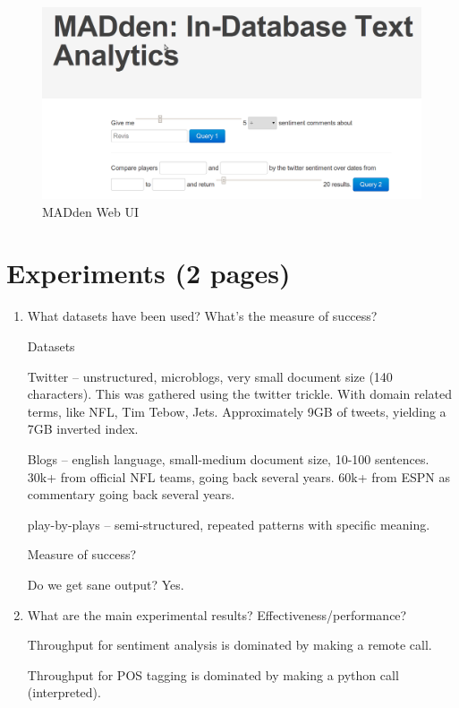 \documentclass{article}
\newcommand{\system}{MADden\xspace}
\begin{document}
\begin{enumerate}
  \begin{figure}
    \begin{center}
      \includegraphics[scale=0.3]{web-ui.png}
      \caption{{\system} Web UI}
      \label{fig:web-ui}
    \end{center}
  \end{figure}

  \section{Experiments (2 pages)}
  \begin{enumerate}
  \item What datasets have been used? What’s the measure of success?

    Datasets

    Twitter -- unstructured, microblogs, very small document size (140 characters). This was gathered using the twitter trickle. With domain related terms, like NFL, Tim Tebow, Jets.
    Approximately 9GB of tweets, yielding a 7GB inverted index.

    Blogs -- english language, small-medium document size, 10-100 sentences.
    30k+ from official NFL teams, going back several years.
    60k+ from ESPN as commentary going back several years.

    play-by-plays -- semi-structured, repeated patterns with specific meaning.


    Measure of success?

    Do we get sane output? Yes.

  \item What are the main experimental results? Effectiveness/performance?

    Throughput for sentiment analysis is dominated by making a remote call.

    Throughput for POS tagging is dominated by making a python call (interpreted).


\end{enumerate}
\end{enumerate}
\end{document}
